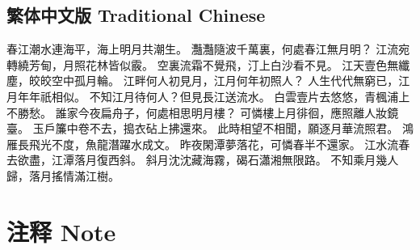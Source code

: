 \documentclass[a4paper]{article}
\begin{document}
    \subsection{繁体中文版 Traditional Chinese}
        \begin{center}
            春江潮水連海平，海上明月共潮生。\newline
            灩灩隨波千萬裏，何處春江無月明？\newline
            江流宛轉繞芳甸，月照花林皆似霰。\newline
            空裏流霜不覺飛，汀上白沙看不見。\newline
            江天壹色無纖塵，皎皎空中孤月輪。\newline
            江畔何人初見月，江月何年初照人？\newline
            人生代代無窮已，江月年年祇相似。\newline
            不知江月待何人？但見長江送流水。\newline
            白雲壹片去悠悠，青楓浦上不勝愁。\newline
            誰家今夜扁舟子，何處相思明月樓？\newline
            可憐樓上月徘徊，應照離人妝鏡臺。\newline
            玉戶簾中卷不去，搗衣砧上拂還來。\newline
            此時相望不相聞，願逐月華流照君。\newline
            鴻雁長飛光不度，魚龍潛躍水成文。\newline
            昨夜閑潭夢落花，可憐春半不還家。\newline
            江水流春去欲盡，江潭落月復西斜。\newline
            斜月沈沈藏海霧，碣石瀟湘無限路。\newline
            不知乘月幾人歸，落月搖情滿江樹。\newline
        \end{center}
\newpage
\section{注释 Note}
\end{document}
